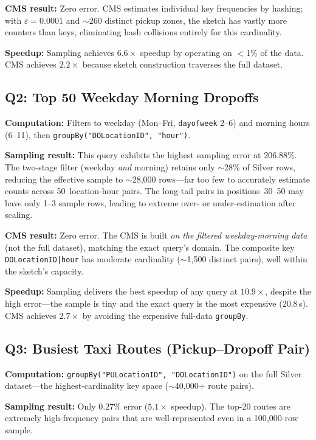 \documentclass{article}
\begin{document}
\textbf{CMS result:} Zero error. CMS estimates individual key frequencies by hashing; with $\varepsilon = 0.0001$ and $\sim$260 distinct pickup zones, the sketch has vastly more counters than keys, eliminating hash collisions entirely for this cardinality.

\textbf{Speedup:} Sampling achieves $6.6\times$ speedup by operating on $<$1\% of the data. CMS achieves $2.2\times$ because sketch construction traverses the full dataset.

\subsection{Q2: Top 50 Weekday Morning Dropoffs}

\textbf{Computation:} Filters to weekday (Mon--Fri, \texttt{dayofweek} 2--6) and morning hours (6--11), then \texttt{groupBy("DOLocationID", "hour")}.

\textbf{Sampling result:} This query exhibits the highest sampling error at $206.88\%$. The two-stage filter (weekday \emph{and} morning) retains only $\sim$28\% of Silver rows, reducing the effective sample to $\sim$28{,}000 rows—far too few to accurately estimate counts across 50~location-hour pairs. The long-tail pairs in positions~30--50 may have only 1--3 sample rows, leading to extreme over- or under-estimation after scaling.

\textbf{CMS result:} Zero error. The CMS is built \emph{on the filtered weekday-morning data} (not the full dataset), matching the exact query's domain. The composite key \texttt{DOLocationID|hour} has moderate cardinality ($\sim$1{,}500 distinct pairs), well within the sketch's capacity.

\textbf{Speedup:} Sampling delivers the best speedup of any query at $10.9\times$, despite the high error—the sample is tiny and the exact query is the most expensive ($20.8\,$s). CMS achieves $2.7\times$ by avoiding the expensive full-data \texttt{groupBy}.

\subsection{Q3: Busiest Taxi Routes (Pickup--Dropoff Pair)}

\textbf{Computation:} \texttt{groupBy("PULocationID", "DOLocationID")} on the full Silver dataset—the highest-cardinality key space ($\sim$40{,}000+ route pairs).

\textbf{Sampling result:} Only $0.27\%$ error ($5.1\times$ speedup). The top-20 routes are extremely high-frequency pairs that are well-represented even in a 100{,}000-row sample.
\end{document}
